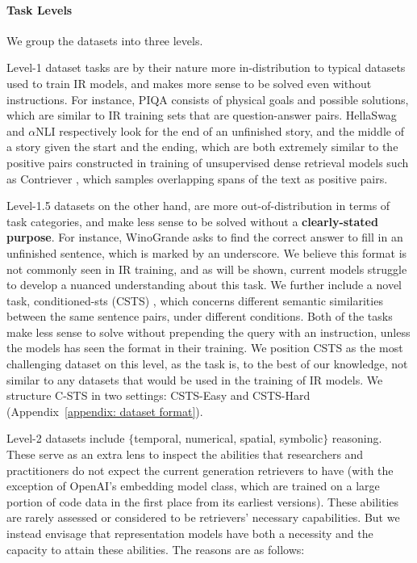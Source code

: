 \documentclass{article} %
\begin{document}


\paragraph{Task Levels} We group the datasets into three levels. 

Level-1 dataset tasks are by their nature more in-distribution to typical datasets used to train IR models, and makes more sense to be solved even without instructions. For instance, PIQA consists of physical goals and possible solutions, which are similar to IR training sets that are question-answer pairs. HellaSwag and $\alpha$NLI respectively look for the end of an unfinished story, and the middle of a story given the start and the ending, which are both extremely similar to the positive pairs constructed in training of unsupervised dense retrieval models such as Contriever \citep{izacard2022unsupervised}, which samples overlapping spans of the text as positive pairs.

Level-1.5 datasets on the other hand, are more out-of-distribution in terms of task categories, and make less sense to be solved without a \textbf{clearly-stated purpose}. For instance, WinoGrande asks to find the correct answer to fill in an unfinished sentence, which is marked by an underscore. We believe this format is not commonly seen in IR training, and as will be shown, current models struggle to develop a nuanced understanding about this task. We further include a novel task, conditioned-sts (CSTS) \citep{deshpande2023csts}, which concerns different semantic similarities between the same sentence pairs, under different conditions. Both of the tasks make less sense to solve without prepending the query with an instruction, unless the models has seen the format in their training. We position CSTS as the most challenging dataset on this level, as the task is, to the best of our knowledge, not similar to any datasets that would be used in the training of IR models. We structure C-STS in two settings: CSTS-Easy and CSTS-Hard (Appendix~\ref{appendix: dataset format}).

Level-2 datasets include $\{$temporal, numerical, spatial, symbolic$\}$ reasoning. These serve as an extra lens to inspect the abilities that researchers and practitioners do not expect the current generation retrievers to have (with the exception of OpenAI's embedding model class, which are trained on a large portion of code data in the first place \citep{neelakantan2022text} from its earliest versions). These abilities are rarely assessed or considered to be retrievers' necessary capabilities. But we instead envisage that representation models have both a necessity and the capacity to attain these abilities. The reasons are as follows:
\end{document}
